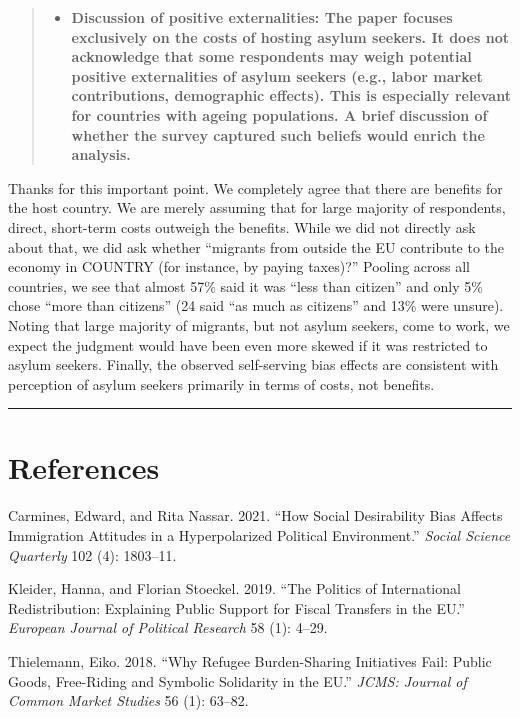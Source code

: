 \documentclass[
  11pt,
]{article}
\providecommand{\tightlist}{%
  \setlength{\itemsep}{0pt}\setlength{\parskip}{0pt}}
\newlength{\cslhangindent}
\newenvironment{CSLReferences}[2] %
 {\begin{list}{}{%
  \setlength{\itemindent}{0pt}
  \setlength{\leftmargin}{0pt}
  \setlength{\parsep}{0pt}
  \ifodd #1
   \setlength{\leftmargin}{\cslhangindent}
   \setlength{\itemindent}{-1\cslhangindent}
  \fi
  \setlength{\itemsep}{#2\baselineskip}}}
 {\end{list}}
\begin{document}
\begin{quote}
\begin{itemize}
\tightlist
\item
  \textbf{Discussion of positive externalities: The paper focuses exclusively on the costs of hosting asylum seekers. It does not acknowledge that some respondents may weigh potential positive externalities of asylum seekers (e.g., labor market contributions, demographic effects). This is especially relevant for countries with ageing populations. A brief discussion of whether the survey captured such beliefs would enrich the analysis.}
\end{itemize}
\end{quote}

Thanks for this important point. We completely agree that there are
benefits for the host country. We are merely assuming that for large
majority of respondents, direct, short-term costs outweigh the
benefits. While we did not directly ask about that, we did ask
whether ``migrants from outside the EU contribute to the economy in
COUNTRY (for instance, by paying taxes)?'' Pooling across all
countries, we see that almost 57\% said it was ``less than citizen''
and only 5\% chose ``more than citizens'' (24 said ``as much as
citizens'' and 13\% were unsure). Noting that large majority of
migrants, but not asylum seekers, come to work, we expect the
judgment would have been even more skewed if it was restricted to
asylum seekers. Finally, the observed self-serving bias effects are
consistent with perception of asylum seekers primarily in terms of
costs, not benefits.

\begin{center}\rule{0.5\linewidth}{0.5pt}\end{center}

\section*{References}\label{references}

\label{refs}
\begin{CSLReferences}{1}{0}
Carmines, Edward, and Rita Nassar. 2021. {``How Social Desirability Bias Affects Immigration Attitudes in a Hyperpolarized Political Environment.''} \emph{Social Science Quarterly} 102 (4): 1803--11.

Kleider, Hanna, and Florian Stoeckel. 2019. {``The Politics of International Redistribution: Explaining Public Support for Fiscal Transfers in the EU.''} \emph{European Journal of Political Research} 58 (1): 4--29.

Thielemann, Eiko. 2018. {``Why Refugee Burden-Sharing Initiatives Fail: Public Goods, Free-Riding and Symbolic Solidarity in the EU.''} \emph{JCMS: Journal of Common Market Studies} 56 (1): 63--82.

\end{CSLReferences}
\end{document}

